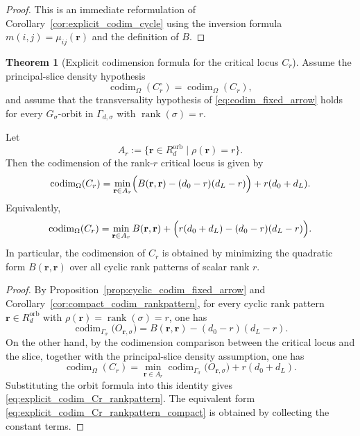\documentclass{article}
\newcommand{\rk}{\operatorname{rank}}
\newcommand{\codim}{\operatorname{codim}}
\theoremstyle{definition}
\newtheorem{theorem}{Theorem}[section]
\begin{document}
\begin{proof}
This is an immediate reformulation of Corollary~\ref{cor:explicit_codim_cycle} using the inversion formula
\(m(i,j)=\mu_{ij}(\mathbf r)\) and the definition of \(B\).
\end{proof}
\begin{theorem}[Explicit codimension formula for the critical locus \(C_r\)]\label{cor:explicit_codim_Cr_rankpattern}
Assume the principal-slice density hypothesis
\[
\codim_{\Omega}(C_r^\circ)=\codim_{\Omega}(C_r),
\]
and assume that the transversality hypothesis of \eqref{eq:codim_fixed_arrow} holds for every
\(G_\sigma\)-orbit in \(\Gamma_{d,\sigma}\) with \(\rk(\sigma)=r\).

Let
\[
A_r:=\{\mathbf r\in R_d^{\mathrm{orb}} \mid \rho(\mathbf r)=r\}.
\]
Then the codimension of the rank-\(r\) critical locus is given by
\begin{equation}\label{eq:explicit_codim_Cr_rankpattern}
\codim_{\Omega}(C_r)
=
\min_{\mathbf r\in A_r}
\Bigl(
B(\mathbf r,\mathbf r)
-
(d_0-r)(d_L-r)
\Bigr)
+
r(d_0+d_L).
\end{equation}
Equivalently,
\begin{equation}\label{eq:explicit_codim_Cr_rankpattern_compact}
\codim_{\Omega}(C_r)
=
\min_{\mathbf r\in A_r}
B(\mathbf r,\mathbf r)
+
\Bigl(
r(d_0+d_L)-(d_0-r)(d_L-r)
\Bigr).
\end{equation}
In particular, the codimension of \(C_r\) is obtained by minimizing the quadratic form
\(B(\mathbf r,\mathbf r)\) over all cyclic rank patterns of scalar rank \(r\).
\end{theorem}

\begin{proof}
By Proposition~\ref{prop:cyclic_codim_fixed_arrow} and Corollary~\ref{cor:compact_codim_rankpattern},
for every cyclic rank pattern \(\mathbf r\in R_d^{\mathrm{orb}}\) with \(\rho(\mathbf r)=\rk(\sigma)=r\), one has
\[
\codim_{\Gamma_\sigma}\!\bigl(O_{\mathbf r,\sigma}\bigr)
=
B(\mathbf r,\mathbf r)
-
(d_0-r)(d_L-r).
\]
On the other hand, by the codimension comparison between the critical locus and the slice,
together with the principal-slice density assumption, one has
\[
\codim_{\Omega}(C_r)
=
\min_{\mathbf r\in A_r}
\codim_{\Gamma_\sigma}\!\bigl(O_{\mathbf r,\sigma}\bigr)
+
r(d_0+d_L).
\]
Substituting the orbit formula into this identity gives
\eqref{eq:explicit_codim_Cr_rankpattern}. The equivalent form
\eqref{eq:explicit_codim_Cr_rankpattern_compact} is obtained by collecting the constant terms.
\end{proof}

\end{document}
